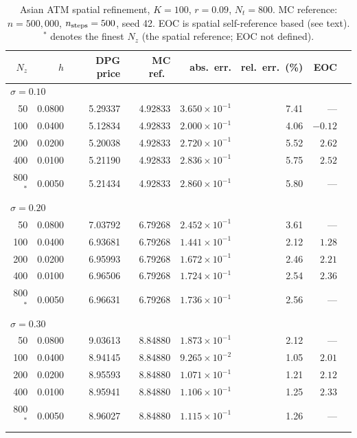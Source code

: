 \documentclass[11pt,a4paper]{article}
\newcommand{\Nz}{N_z}
\newcommand{\Nt}{N_t}
\begin{document}
\begin{table}[htbp]
\centering
\caption{Asian ATM spatial refinement, $K = 100$, $r = 0.09$, $\Nt = 800$.
         MC reference: $n = 500{,}000$, $n_{\rm steps} = 500$, seed 42.
         EOC is spatial self-reference based (see text).
         ${}^*$ denotes the finest $\Nz$ (the spatial reference; EOC not defined).}
\label{tab:spatial-atm}
\small
\begin{tabular}{rrrrrrrr}
\toprule
$\Nz$ & $h$ & DPG price & MC ref.\ & abs.\ err. & rel.\ err.\ (\%) & EOC \\
\midrule
\multicolumn{7}{l}{$\sigma = 0.10$} \\
\midrule
   50 & 0.0800 & 5.29337 & 4.92833 & $3.650\times10^{-1}$ & 7.41 & --- \\
  100 & 0.0400 & 5.12834 & 4.92833 & $2.000\times10^{-1}$ & 4.06 & $-0.12$ \\
  200 & 0.0200 & 5.20038 & 4.92833 & $2.720\times10^{-1}$ & 5.52 & $2.62$ \\
  400 & 0.0100 & 5.21190 & 4.92833 & $2.836\times10^{-1}$ & 5.75 & $2.52$ \\
  800$^*$ & 0.0050 & 5.21434 & 4.92833 & $2.860\times10^{-1}$ & 5.80 & --- \\
\midrule
\multicolumn{7}{l}{$\sigma = 0.20$} \\
\midrule
   50 & 0.0800 & 7.03792 & 6.79268 & $2.452\times10^{-1}$ & 3.61 & --- \\
  100 & 0.0400 & 6.93681 & 6.79268 & $1.441\times10^{-1}$ & 2.12 & $1.28$ \\
  200 & 0.0200 & 6.95993 & 6.79268 & $1.672\times10^{-1}$ & 2.46 & $2.21$ \\
  400 & 0.0100 & 6.96506 & 6.79268 & $1.724\times10^{-1}$ & 2.54 & $2.36$ \\
  800$^*$ & 0.0050 & 6.96631 & 6.79268 & $1.736\times10^{-1}$ & 2.56 & --- \\
\midrule
\multicolumn{7}{l}{$\sigma = 0.30$} \\
\midrule
   50 & 0.0800 & 9.03613 & 8.84880 & $1.873\times10^{-1}$ & 2.12 & --- \\
  100 & 0.0400 & 8.94145 & 8.84880 & $9.265\times10^{-2}$ & 1.05 & $2.01$ \\
  200 & 0.0200 & 8.95593 & 8.84880 & $1.071\times10^{-1}$ & 1.21 & $2.12$ \\
  400 & 0.0100 & 8.95941 & 8.84880 & $1.106\times10^{-1}$ & 1.25 & $2.33$ \\
  800$^*$ & 0.0050 & 8.96027 & 8.84880 & $1.115\times10^{-1}$ & 1.26 & --- \\
\bottomrule
\end{tabular}
\end{table}
\end{document}
